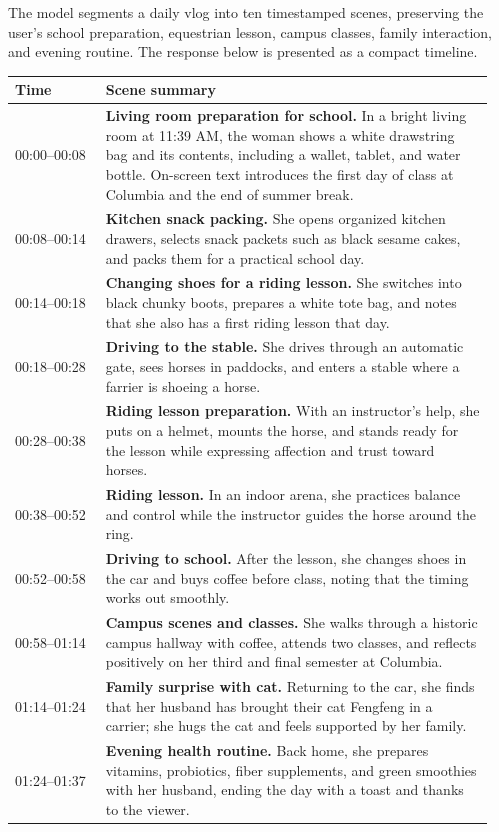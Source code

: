\begin{caseresponse}
The model segments a daily vlog into ten timestamped scenes, preserving the user's school preparation, equestrian lesson, campus classes, family interaction, and evening routine. The response below is presented as a compact timeline.

\renewcommand{\arraystretch}{1.08}
\begin{tabular}{p{0.18\linewidth}p{0.77\linewidth}}
\toprule
\textbf{Time} & \textbf{Scene summary} \\
\midrule
00:00--00:08 & \textbf{Living room preparation for school.} In a bright living room at 11:39 AM, the woman shows a white drawstring bag and its contents, including a wallet, tablet, and water bottle. On-screen text introduces the first day of class at Columbia and the end of summer break. \\
00:08--00:14 & \textbf{Kitchen snack packing.} She opens organized kitchen drawers, selects snack packets such as black sesame cakes, and packs them for a practical school day. \\
00:14--00:18 & \textbf{Changing shoes for a riding lesson.} She switches into black chunky boots, prepares a white tote bag, and notes that she also has a first riding lesson that day. \\
00:18--00:28 & \textbf{Driving to the stable.} She drives through an automatic gate, sees horses in paddocks, and enters a stable where a farrier is shoeing a horse. \\
00:28--00:38 & \textbf{Riding lesson preparation.} With an instructor's help, she puts on a helmet, mounts the horse, and stands ready for the lesson while expressing affection and trust toward horses. \\
00:38--00:52 & \textbf{Riding lesson.} In an indoor arena, she practices balance and control while the instructor guides the horse around the ring. \\
00:52--00:58 & \textbf{Driving to school.} After the lesson, she changes shoes in the car and buys coffee before class, noting that the timing works out smoothly. \\
00:58--01:14 & \textbf{Campus scenes and classes.} She walks through a historic campus hallway with coffee, attends two classes, and reflects positively on her third and final semester at Columbia. \\
01:14--01:24 & \textbf{Family surprise with cat.} Returning to the car, she finds that her husband has brought their cat Fengfeng in a carrier; she hugs the cat and feels supported by her family. \\
01:24--01:37 & \textbf{Evening health routine.} Back home, she prepares vitamins, probiotics, fiber supplements, and green smoothies with her husband, ending the day with a toast and thanks to the viewer. \\
\bottomrule
\end{tabular}
\renewcommand{\arraystretch}{1}
\end{caseresponse}


